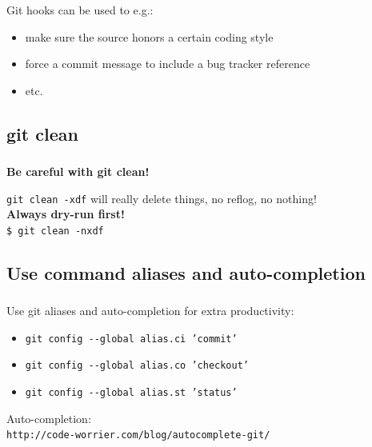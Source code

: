 \begin{frame}
  \frametitle{\insertsubsection}

  Git hooks can be used to e.g.:\\
  \begin{itemize}
    \item make sure the source honors a certain coding style
    \item force a commit message to include a bug tracker reference
    \item etc.
  \end{itemize}

\end{frame}


\subsection{git clean}

\begin{frame}
  \frametitle{\insertsubsection}

  \begin{center}
    \textbf{Be careful with git clean!}
  \end{center}

  \texttt{git clean -xdf} will really delete things, no reflog, no nothing!\\
  \textbf{Always dry-run first!}\\
  \texttt{\$ git clean -nxdf}

\end{frame}


\subsection{Use command aliases and auto-completion}

\begin{frame}
  \frametitle{\insertsubsection}

  Use git aliases and auto-completion for extra productivity:\\
  \begin{itemize}
      \item \texttt{git config -{}-global alias.ci 'commit'}
      \item \texttt{git config -{}-global alias.co 'checkout'}
      \item \texttt{git config -{}-global alias.st 'status'}
  \end{itemize}
\vspace*{20pt}
  Auto-completion:\\
  \texttt{http://code-worrier.com/blog/autocomplete-git/}

\end{frame}

